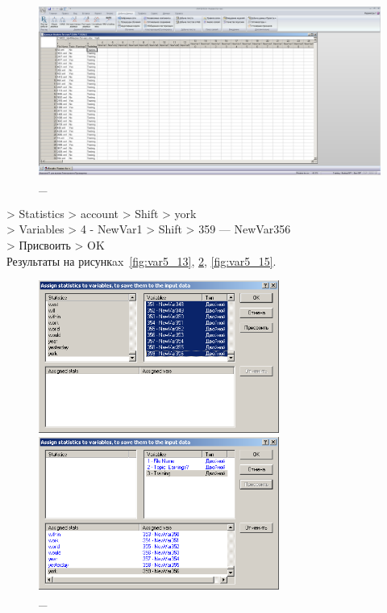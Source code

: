 \begin{figure}[p!h]
  \centering

  \includegraphics[width=17cm]
  {inc/var5/12.PNG}

  \caption{\_}

  \label{fig:var5_12}
\end{figure}


> Statistics > account > Shift > york \\
> Variables > 4 - NewVar1 > Shift > 359 — NewVar356 \\
> Присвоить > OK \\

Результаты на рисункax~\ref{fig:var5_13}, \ref{fig:var5_14}, \ref{fig:var5_15}.

\begin{figure}[p!h]
  \centering

  \begin{minipage}{0.49\textwidth}
    \centering

    \includegraphics[height=5cm]
    {inc/var5/13.PNG}

    \caption{\_}

    \label{fig:var5_13}
  \end{minipage}
  \begin{minipage}{0.49\textwidth}
    \centering

    \includegraphics[height=5cm]
    {inc/var5/14.PNG}

    \caption{\_}

    \label{fig:var5_14}
  \end{minipage}
\end{figure}

